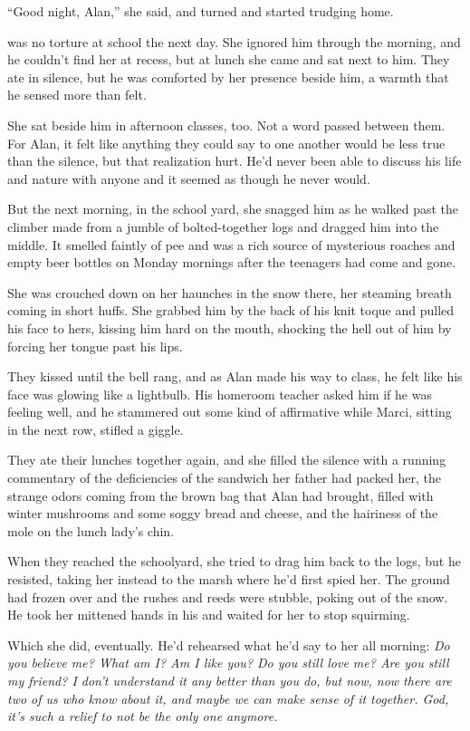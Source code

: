 ``Good night, Alan,'' she said, and turned and started trudging home.

 was no torture at school the next day.  She ignored him through
the morning, and he couldn't find her at recess, but at lunch she came
and sat next to him.  They ate in silence, but he was comforted by her
presence beside him, a warmth that he sensed more than felt.

She sat beside him in afternoon classes, too.  Not a word passed
between them.  For Alan, it felt like anything they could say to one
another would be less true than the silence, but that realization
hurt.  He'd never been able to discuss his life and nature with anyone
and it seemed as though he never would.

But the next morning, in the school yard, she snagged him as he walked
past the climber made from a jumble of bolted-together logs and
dragged him into the middle.  It smelled faintly of pee and was a rich
source of mysterious roaches and empty beer bottles on Monday mornings
after the teenagers had come and gone.

She was crouched down on her haunches in the snow there, her steaming
breath coming in short huffs.  She grabbed him by the back of his knit
toque and pulled his face to hers, kissing him hard on the mouth,
shocking the hell out of him by forcing her tongue past his lips.

They kissed until the bell rang, and as Alan made his way to class, he
felt like his face was glowing like a lightbulb.  His homeroom teacher
asked him if he was feeling well, and he stammered out some kind of
affirmative while Marci, sitting in the next row, stifled a giggle.

They ate their lunches together again, and she filled the silence with
a running commentary of the deficiencies of the sandwich her father
had packed her, the strange odors coming from the brown bag that Alan
had brought, filled with winter mushrooms and some soggy bread and
cheese, and the hairiness of the mole on the lunch lady's chin.

When they reached the schoolyard, she tried to drag him back to the
logs, but he resisted, taking her instead to the marsh where he'd
first spied her.  The ground had frozen over and the rushes and reeds
were stubble, poking out of the snow.  He took her mittened hands in
his and waited for her to stop squirming.

Which she did, eventually.  He'd rehearsed what he'd say to her all
morning:  \textit{Do you believe me?  What am I?  Am I like you?  Do
you still love me?  Are you still my friend?  I don't understand it
any better than you do, but now, now there are two of us who know
about it, and maybe we can make sense of it together.  God, it's such
a relief to not be the only one anymore.}

